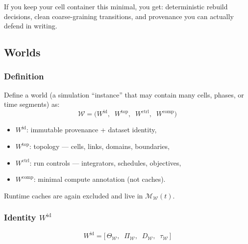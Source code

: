 \documentclass[11pt, a4paper, oneside]{article}
\theoremstyle{definition}
\theoremstyle{remark}
\begin{document}
If you keep your cell container this minimal, you get: deterministic
rebuild decisions, clean coarse-graining transitions, and provenance
you can actually defend in writing.


\subsection{Worlds}
\label{sec:world-container}

\subsubsection{Definition}
\label{sec:world-def}

Define a world (a simulation ``instance'' that may contain many
cells, phases, or time segments) as:
%
\begin{equation}
  \mathcal{W} =
  \bigl(
    W^{\mathrm{id}},\;\;
    W^{\mathrm{top}},\;\;
    W^{\mathrm{ctrl}},\;\;
    W^{\mathrm{comp}}
  \bigr)
  \label{eq:world}
\end{equation}
%
\begin{itemize}
  \item $W^{\mathrm{id}}$: immutable provenance + dataset identity,
  \item $W^{\mathrm{top}}$: topology — cells, links, domains, boundaries,
  \item $W^{\mathrm{ctrl}}$: run controls — integrators, schedules, objectives,
  \item $W^{\mathrm{comp}}$: minimal compute annotation (not caches).
\end{itemize}

\noindent
Runtime caches are again excluded and live in
$\mathcal{M}_{\mathcal{W}}(t)$.

\subsubsection{Identity \texorpdfstring{$W^{\mathrm{id}}$}{Wid}}
\label{sec:world-identity}

\begin{equation}
  W^{\mathrm{id}} =
  \bigl[\,
    \Theta_{\mathcal{W}},\;\;
    \Pi_{\mathcal{W}},\;\;
    D_{\mathcal{W}},\;\;
    \tau_{\mathcal{W}}
  \,\bigr]
  \label{eq:world-identity}
\end{equation}
\end{document}
